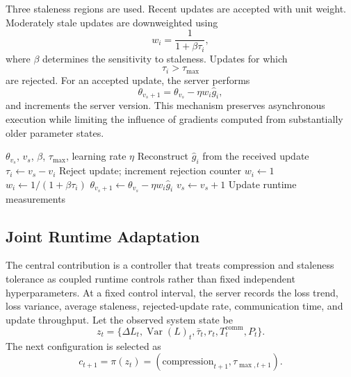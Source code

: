 \documentclass[conference]{IEEEtran}
\begin{document}
Three staleness regions are used. Recent updates are accepted with unit weight. Moderately stale updates are downweighted using
\begin{equation}
 w_i=\frac{1}{1+\beta\tau_i},
 \label{eq:weight}
\end{equation}
where $\beta$ determines the sensitivity to staleness. Updates for which
\begin{equation}
 \tau_i>\tau_{\max}
 \label{eq:reject}
\end{equation}
are rejected. For an accepted update, the server performs
\begin{equation}
 \theta_{v_s+1}=\theta_{v_s}-\eta w_i\hat g_i,
 \label{eq:update}
\end{equation}
and increments the server version. This mechanism preserves asynchronous execution while limiting the influence of gradients computed from substantially older parameter states.

\begin{algorithm}[t]
\caption{Staleness-Aware Server Update}
\label{alg:server}
\begin{algorithmic}[1]
\Require $\theta_{v_s}$, $v_s$, $\beta$, $\tau_{\max}$, learning rate $\eta$
  \State Reconstruct $\hat g_i$ from the received update
  \State $\tau_i\gets v_s-v_i$
    \State Reject update; increment rejection counter
  \Else
      \State $w_i\gets1$
    \Else
      \State $w_i\gets1/(1+\beta\tau_i)$
    \EndIf
    \State $\theta_{v_s+1}\gets\theta_{v_s}-\eta w_i\hat g_i$
    \State $v_s\gets v_s+1$
  \EndIf
  \State Update runtime measurements
\EndFor
\end{algorithmic}
\end{algorithm}

\subsection{Joint Runtime Adaptation}
\label{subsec:controller}

The central contribution is a controller that treats compression and staleness tolerance as coupled runtime controls rather than fixed independent hyperparameters. At a fixed control interval, the server records the loss trend, loss variance, average staleness, rejected-update rate, communication time, and update throughput. Let the observed system state be
\begin{equation}
 z_t=\{\Delta L_t,\operatorname{Var}(L)_t,\bar\tau_t,r_t,T_t^{\mathrm{comm}},P_t\}.
 \label{eq:state}
\end{equation}
The next configuration is selected as
\begin{equation}
 c_{t+1}=\pi(z_t)=\left(\text{compression}_{t+1},\tau_{\max,t+1}\right).
 \label{eq:controller}
\end{equation}
\end{document}

